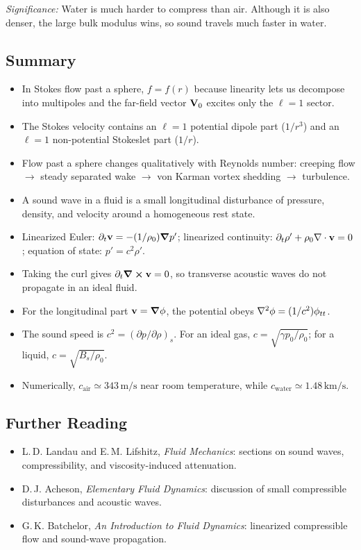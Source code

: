 \documentclass[../main.tex]{subfiles}
\begin{document}
\textit{Significance:} Water is much harder to compress than air. Although it is
also denser, the large bulk modulus wins, so sound travels much faster in water.

\subsection*{Summary}
\begin{itemize}
  \item In Stokes flow past a sphere, $f=f(r)$ because linearity lets us
  decompose into multipoles and the far-field vector $\mathbf{V}_0$ excites only
  the $\ell=1$ sector.
  \item The Stokes velocity contains an $\ell=1$ potential dipole part
  ($1/r^3$) and an $\ell=1$ non-potential Stokeslet part ($1/r$).
  \item Flow past a sphere changes qualitatively with Reynolds number:
  creeping flow $\to$ steady separated wake $\to$ von Karman vortex shedding
  $\to$ turbulence.
  \item A sound wave in a fluid is a small longitudinal disturbance of pressure,
  density, and velocity around a homogeneous rest state.
  \item Linearized Euler:
  $\partial_t\mathbf{v}=-(1/\rho_0)\grad p'$; linearized continuity:
  $\partial_t\rho'+\rho_0\nabla \cdot\mathbf{v}=0$; equation of state:
  $p'=c^2\rho'$.
  \item Taking the curl gives $\partial_t\curl\mathbf{v}=0$, so transverse acoustic
  waves do not propagate in an ideal fluid.
  \item For the longitudinal part $\mathbf{v}=\grad\phi$, the potential obeys
  $\nabla^2\phi=(1/c^2)\phi_{tt}$.
  \item The sound speed is $c^2=(\partial p/\partial\rho)_s$. For an ideal gas,
  $c=\sqrt{\gamma p_0/\rho_0}$; for a liquid,
  $c=\sqrt{B_s/\rho_0}$.
  \item Numerically, $c_{\mathrm{air}}\simeq343\,\mathrm{m/s}$ near room
  temperature, while $c_{\mathrm{water}}\simeq1.48\,\mathrm{km/s}$.
\end{itemize}

\subsection*{Further Reading}
\begin{itemize}
  \item L.\,D. Landau and E.\,M. Lifshitz, \textit{Fluid Mechanics}:
  sections on sound waves, compressibility, and viscosity-induced attenuation.
  \item D.\,J. Acheson, \textit{Elementary Fluid Dynamics}: discussion of small
  compressible disturbances and acoustic waves.
  \item G.\,K. Batchelor, \textit{An Introduction to Fluid Dynamics}: linearized
  compressible flow and sound-wave propagation.
\end{itemize}
\end{document}
